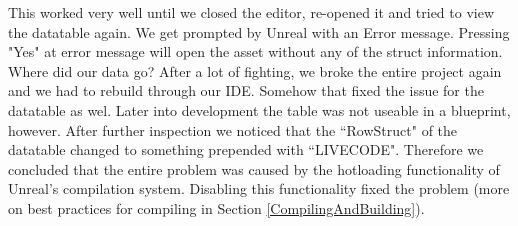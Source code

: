 \documentclass{uva-inf-article}
\begin{document}
This worked very well until we closed the editor, re-opened it and tried to view the datatable again. We get prompted by Unreal with an Error message. Pressing "Yes" at error message will open the asset without any of the struct information. Where did our data go? After a lot of fighting, we broke the entire project again and we had to rebuild through our IDE. Somehow that fixed the issue for the datatable as wel. Later into development the table was not useable in a blueprint, however. After further inspection we noticed that the ``RowStruct" of the datatable changed to something prepended with ``LIVECODE". Therefore we concluded that the entire problem was caused by the hotloading functionality of Unreal's compilation system. Disabling this functionality fixed the problem (more on best practices for compiling in Section \ref{CompilingAndBuilding}).



\printbibliography



\end{document}
